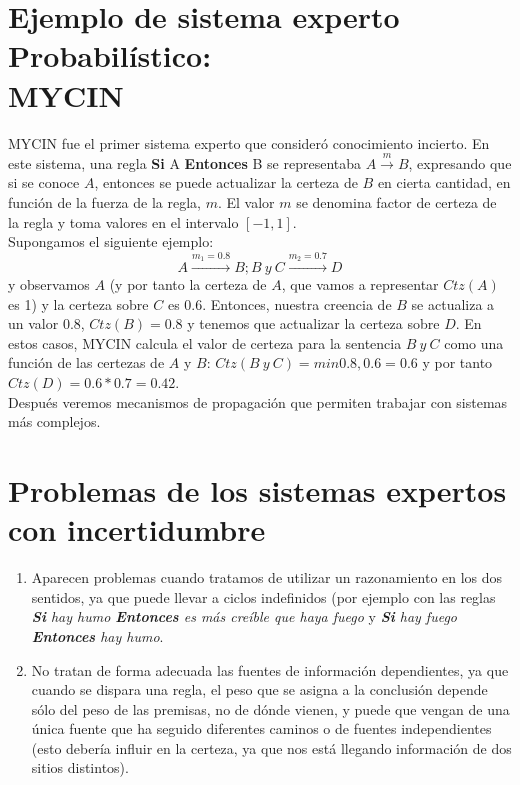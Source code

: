 \documentclass{article}
\begin{document}
\section{Ejemplo de sistema experto Probabilístico:\\ MYCIN}
MYCIN fue el primer sistema experto que consideró conocimiento incierto. En este sistema, una regla \textbf{Si} A \textbf{Entonces} B se representaba $A \overset{m}{\rightarrow}B$, expresando que si se conoce $A$, entonces se puede actualizar la certeza de $B$ en cierta cantidad, en función de la fuerza de la regla, $m$. El valor $m$ se denomina factor de certeza de la regla y toma valores en el intervalo $[-1,1]$.\\

Supongamos el siguiente ejemplo:
\[A \overset{m_1=0.8}{\longrightarrow} B ; B\ y\ C \overset{m_2=0.7}{\longrightarrow} D
\]
y observamos $A$ (y por tanto la certeza de $A$, que vamos a representar $Ctz(A)$ es 1) y la certeza sobre $C$ es 0.6. Entonces, nuestra creencia de $B$ se actualiza a un valor 0.8, $Ctz(B)=0.8$ y tenemos que actualizar la certeza sobre $D$. En estos casos, MYCIN calcula el valor de certeza para la sentencia $B\ y \ C$ como una función de las certezas de $A$ y $B$: $Ctz(B\ y\ C) = min{0.8,0.6}=0.6$ y por tanto $Ctz(D)=0.6*0.7=0.42$.\\
Después veremos mecanismos de propagación que permiten trabajar con sistemas más complejos.

\section{Problemas de los sistemas expertos con incertidumbre}
\begin{enumerate}
    \item Aparecen problemas cuando tratamos de utilizar un razonamiento en los dos sentidos, ya que puede llevar a ciclos indefinidos (por ejemplo con las reglas \textit{\textbf{Si} hay humo \textbf{Entonces} es más creíble que haya fuego} y \textit{\textbf{Si} hay fuego \textbf{Entonces} hay humo}.
    \item No tratan de forma adecuada las fuentes de información dependientes, ya que cuando se dispara una regla, el peso que se asigna a la conclusión depende sólo del peso de las premisas, no de dónde vienen, y puede que vengan de una única fuente que ha seguido diferentes caminos o de fuentes independientes (esto debería influir en la certeza, ya que nos está llegando información de dos sitios distintos).
\end{enumerate}
\end{document}
